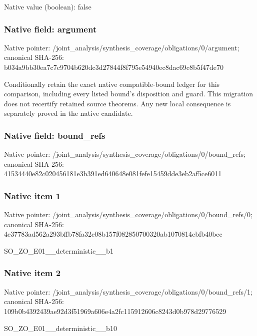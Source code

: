 \documentclass[10pt,a4paper]{article}
\begin{document}
Native value (boolean): false

\subsubsection{Native field: argument}
Native pointer: /joint\_\allowbreak{}analysis/synthesis\_\allowbreak{}coverage/obligations/0/argument; canonical SHA-256: b034a9bb30ea7c7c9704b620dc3d27844f8f795e54940ec8dac69c8b5f47de70

\begingroup\raggedright\sloppy Conditionally retain the exact native compatible-bound ledger for this comparison,\allowbreak{} including every listed bound's disposition and guard. This migration does not recertify retained source theorems. Any new local consequence is separately proved in the native candidate.\par\endgroup

\subsubsection{Native field: bound\_\allowbreak{}refs}
Native pointer: /joint\_\allowbreak{}analysis/synthesis\_\allowbreak{}coverage/obligations/0/bound\_\allowbreak{}refs; canonical SHA-256: 41534440e82c020456181e3b391ed640648e081fefe15459dde3eb2af5ce6011

\subsubsection{Native item 1}
Native pointer: /joint\_\allowbreak{}analysis/synthesis\_\allowbreak{}coverage/obligations/0/bound\_\allowbreak{}refs/0; canonical SHA-256: 4e37783ad562a293bffb78fa32c08b157f082850700320ab1070814cbfb40bcc

\begingroup\raggedright\sloppy SO\_\allowbreak{}ZO\_\allowbreak{}E01\_\allowbreak{}\_\allowbreak{}deterministic\_\allowbreak{}\_\allowbreak{}b1\par\endgroup

\subsubsection{Native item 2}
Native pointer: /joint\_\allowbreak{}analysis/synthesis\_\allowbreak{}coverage/obligations/0/bound\_\allowbreak{}refs/1; canonical SHA-256: 109b0b4392439ae92d3f51969a606e4a2fc115912606c8243d0b978d29776529

\begingroup\raggedright\sloppy SO\_\allowbreak{}ZO\_\allowbreak{}E01\_\allowbreak{}\_\allowbreak{}deterministic\_\allowbreak{}\_\allowbreak{}b10\par\endgroup
\end{document}
